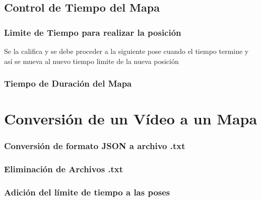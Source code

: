 \subsection{Control de Tiempo del Mapa}

\subsubsection{Limite de Tiempo para realizar la posición}

Se la califica y se debe proceder a la siguiente pose cuando el tiempo termine y así se mueva al nuevo tiempo limite de la nueva posición

\subsubsection{Tiempo de Duración del Mapa}



\section{Conversión de un Vídeo a un Mapa}

\subsubsection{Conversión de formato JSON a archivo .txt}

\subsubsection{Eliminación de Archivos .txt}

\subsubsection{Adición del límite de tiempo a las poses}



